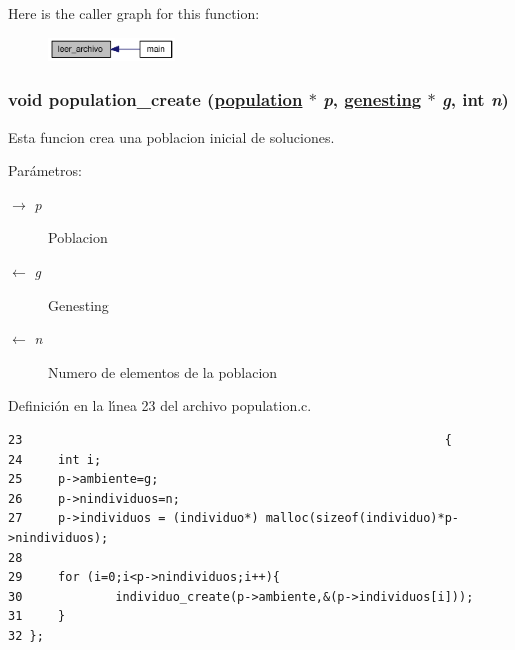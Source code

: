 Here is the caller graph for this function:\begin{figure}[H]
\begin{center}
\leavevmode
\includegraphics[width=95pt]{group__genetic_g6fed4910dd1f6172bb5a4e35a97bbe56_g6fed4910dd1f6172bb5a4e35a97bbe56_icgraph}
\end{center}
\end{figure}
\hypertarget{group__genetic_gc7ba874876f18abab66f0a42f32b98cc_gc7ba874876f18abab66f0a42f32b98cc}{
\subsubsection[population\_\-create]{\setlength{\rightskip}{0pt plus 5cm}void population\_\-create (\hyperlink{struct__population}{population} $\ast$ {\em p}, \hyperlink{struct__genesting}{genesting} $\ast$ {\em g}, int {\em n})}}
\label{group__genetic_gc7ba874876f18abab66f0a42f32b98cc_gc7ba874876f18abab66f0a42f32b98cc}


Esta funcion crea una poblacion inicial de soluciones.

\begin{Desc}
\item[Par\'{a}metros:]
\begin{description}
\item[\mbox{$\rightarrow$} {\em p}]Poblacion \item[\mbox{$\leftarrow$} {\em g}]Genesting \item[\mbox{$\leftarrow$} {\em n}]Numero de elementos de la poblacion \end{description}
\end{Desc}


Definici\'{o}n en la l\'{\i}nea 23 del archivo population.c.

\begin{Code}\begin{verbatim}23                                                           {
24     int i;
25     p->ambiente=g;
26     p->nindividuos=n;
27     p->individuos = (individuo*) malloc(sizeof(individuo)*p->nindividuos);
28 
29     for (i=0;i<p->nindividuos;i++){
30             individuo_create(p->ambiente,&(p->individuos[i]));
31     }
32 };
\end{verbatim}\end{Code}




